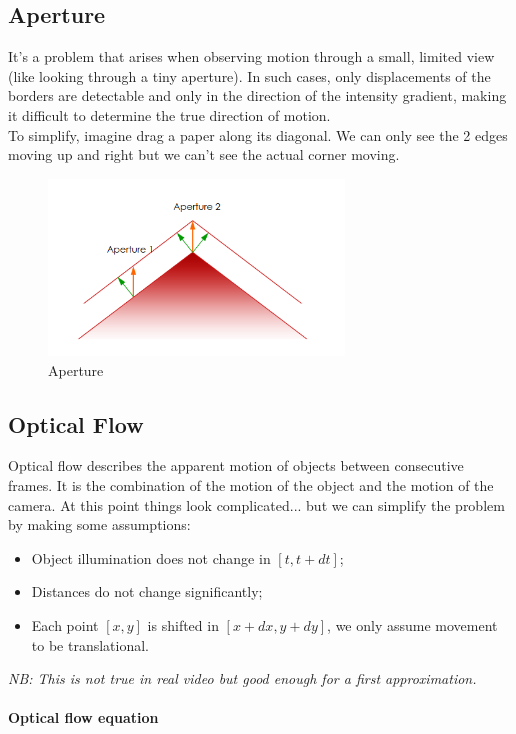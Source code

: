 \subsection{Aperture}
It's a problem that arises when observing motion through a small, limited view (like looking through a tiny aperture). 
In such cases, only displacements of the borders are detectable and only in the direction of the intensity gradient, making it difficult to determine the true direction of motion. 
\\To simplify, imagine drag a paper along its diagonal. We can only see the 2 edges moving up and right but we can't see the actual corner moving.
\begin{figure}[h]
    \centering
    \includegraphics[width=0.7\textwidth]{Figures/Aperture.png}
    \caption{Aperture}
\end{figure}
\subsection{Optical Flow}
Optical flow describes the apparent motion of objects between consecutive frames. It is the combination of the motion of the object and the motion of the camera.
At this point things look complicated... but we can simplify the problem by making some assumptions:
\begin{itemize}
    \item Object illumination does not change in $[t, t + dt]$;
    \item Distances do not change significantly;
    \item Each point $[x,y]$ is shifted in $[x + dx, y + dy]$, we only assume movement to be translational.
\end{itemize}
\textit{NB: This is not true in real video but good enough for a first approximation.}\\
\\\textbf{Optical flow equation}
\\

